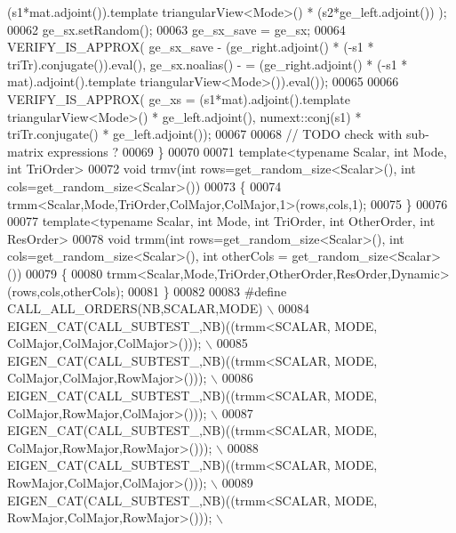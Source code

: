 \begin{DoxyCode}
       (s1*mat.adjoint()).\textcolor{keyword}{template} triangularView<Mode>() * (s2*ge\_left.adjoint()) );
00062   ge\_sx.setRandom();
00063   ge\_sx\_save = ge\_sx;
00064   VERIFY\_IS\_APPROX( ge\_sx\_save - (ge\_right.adjoint() * (-s1 * triTr).conjugate()).eval(), ge\_sx.noalias() -
      = (ge\_right.adjoint() * (-s1 * mat).adjoint().template triangularView<Mode>()).eval());
00065   
00066   VERIFY\_IS\_APPROX( ge\_xs = (s1*mat).adjoint().\textcolor{keyword}{template} triangularView<Mode>() * ge\_left.adjoint(), 
      numext::conj(s1) * triTr.conjugate() * ge\_left.adjoint());
00067   
00068   \textcolor{comment}{// TODO check with sub-matrix expressions ?}
00069 \}
00070 
00071 \textcolor{keyword}{template}<\textcolor{keyword}{typename} Scalar, \textcolor{keywordtype}{int} Mode, \textcolor{keywordtype}{int} TriOrder>
00072 \textcolor{keywordtype}{void} trmv(\textcolor{keywordtype}{int} rows=get\_random\_size<Scalar>(), \textcolor{keywordtype}{int} cols=get\_random\_size<Scalar>())
00073 \{
00074   trmm<Scalar,Mode,TriOrder,ColMajor,ColMajor,1>(rows,cols,1);
00075 \}
00076 
00077 \textcolor{keyword}{template}<\textcolor{keyword}{typename} Scalar, \textcolor{keywordtype}{int} Mode, \textcolor{keywordtype}{int} TriOrder, \textcolor{keywordtype}{int} OtherOrder, \textcolor{keywordtype}{int} ResOrder>
00078 \textcolor{keywordtype}{void} trmm(\textcolor{keywordtype}{int} rows=get\_random\_size<Scalar>(), \textcolor{keywordtype}{int} cols=get\_random\_size<Scalar>(), \textcolor{keywordtype}{int} otherCols = 
      get\_random\_size<Scalar>())
00079 \{
00080   trmm<Scalar,Mode,TriOrder,OtherOrder,ResOrder,Dynamic>(rows,cols,otherCols);
00081 \}
00082 
00083 \textcolor{preprocessor}{#define CALL\_ALL\_ORDERS(NB,SCALAR,MODE)                                             \(\backslash\)}
00084 \textcolor{preprocessor}{  EIGEN\_CAT(CALL\_SUBTEST\_,NB)((trmm<SCALAR, MODE, ColMajor,ColMajor,ColMajor>()));  \(\backslash\)}
00085 \textcolor{preprocessor}{  EIGEN\_CAT(CALL\_SUBTEST\_,NB)((trmm<SCALAR, MODE, ColMajor,ColMajor,RowMajor>()));  \(\backslash\)}
00086 \textcolor{preprocessor}{  EIGEN\_CAT(CALL\_SUBTEST\_,NB)((trmm<SCALAR, MODE, ColMajor,RowMajor,ColMajor>()));  \(\backslash\)}
00087 \textcolor{preprocessor}{  EIGEN\_CAT(CALL\_SUBTEST\_,NB)((trmm<SCALAR, MODE, ColMajor,RowMajor,RowMajor>()));  \(\backslash\)}
00088 \textcolor{preprocessor}{  EIGEN\_CAT(CALL\_SUBTEST\_,NB)((trmm<SCALAR, MODE, RowMajor,ColMajor,ColMajor>()));  \(\backslash\)}
00089 \textcolor{preprocessor}{  EIGEN\_CAT(CALL\_SUBTEST\_,NB)((trmm<SCALAR, MODE, RowMajor,ColMajor,RowMajor>()));  \(\backslash\)}

\end{DoxyCode}
